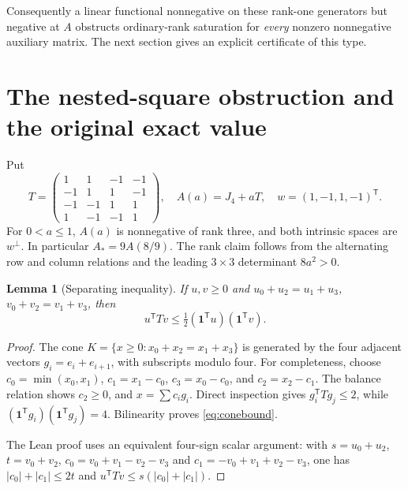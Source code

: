 \documentclass[11pt]{article}
\newtheorem{lemma}[theorem]{Lemma}
\theoremstyle{definition}\newtheorem{definition}[theorem]{Definition}
\theoremstyle{remark}\newtheorem{remark}[theorem]{Remark}
\newcommand{\one}{\mathbf 1}
\begin{document}
Consequently a linear functional nonnegative on these rank-one generators but negative at $A$ obstructs ordinary-rank saturation for \emph{every} nonzero nonnegative auxiliary matrix. The next section gives an explicit certificate of this type.

\section{The nested-square obstruction and the original exact value}\label{sec:obstruction}

Put
\begin{equation}\label{eq:twist}
T=\begin{pmatrix}1&1&-1&-1\\-1&1&1&-1\\-1&-1&1&1\\1&-1&-1&1\end{pmatrix},
\quad A(a)=J_4+aT,
\quad w=(1,-1,1,-1)^{\mathsf T}.
\end{equation}
For $0<a\le1$, $A(a)$ is nonnegative of rank three, and both intrinsic spaces are $w^\perp$. In particular $A_*=9A(8/9)$. The rank claim follows from the alternating row and column relations and the leading $3\times3$ determinant $8a^2>0$.

\begin{lemma}[Separating inequality]\label{lem:cone}
If $u,v\ge0$ and $u_0+u_2=u_1+u_3$, $v_0+v_2=v_1+v_3$, then
\begin{equation}\label{eq:conebound}
u^{\mathsf T}Tv\le\tfrac12(\one^{\mathsf T}u)(\one^{\mathsf T}v).
\end{equation}
\end{lemma}
\begin{proof}
The cone $K=\{x\ge0:x_0+x_2=x_1+x_3\}$ is generated by the four adjacent vectors $g_i=e_i+e_{i+1}$, with subscripts modulo four. For completeness, choose $c_0=\min(x_0,x_1)$, $c_1=x_1-c_0$, $c_3=x_0-c_0$, and $c_2=x_2-c_1$. The balance relation shows $c_2\ge0$, and $x=\sum c_i g_i$. Direct inspection gives $g_i^{\mathsf T}Tg_j\le2$, while $(\one^{\mathsf T}g_i)(\one^{\mathsf T}g_j)=4$. Bilinearity proves \eqref{eq:conebound}.

The Lean proof uses an equivalent four-sign scalar argument: with $s=u_0+u_2$, $t=v_0+v_2$, $c_0=v_0+v_1-v_2-v_3$ and $c_1=-v_0+v_1+v_2-v_3$, one has $|c_0|+|c_1|\le2t$ and $u^{\mathsf T}Tv\le s(|c_0|+|c_1|)$.
\end{proof}
\end{document}
